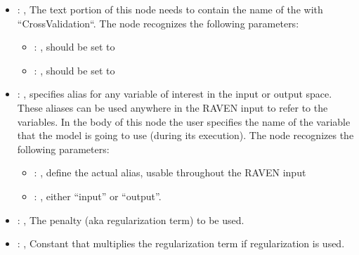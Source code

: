 \begin{itemize}
\begin{itemize}
        \item {}: ,
          List of IDs of features/variables to include in the transformation process.

        \item {}: ,
          Which space to search? Target or Feature?
      \end{itemize}

    \item {}: ,
      The text portion of this node needs to contain the name of the  with
               ``CrossValidation``.
      The  node recognizes the following parameters:
        \begin{itemize}
          \item {}: ,
            should be set to 
          \item {}: ,
            should be set to 
      \end{itemize}

    \item {}: ,
      specifies alias for         any variable of interest in the input or output space. These
      aliases can be used anywhere in the RAVEN input to         refer to the variables. In the body
      of this node the user specifies the name of the variable that the model is going to use
      (during its execution).
      The  node recognizes the following parameters:
        \begin{itemize}
          \item {}: ,
            define the actual alias, usable throughout the RAVEN input
          \item {}: ,
            either ``input'' or ``output''.
      \end{itemize}

    \item {}: \xmlDesc{[l2,  l1, elasticnet]},
      The penalty (aka regularization term) to be used.

    \item {}: ,
      Constant that multiplies the regularization term if regularization is used.


\end{itemize}
